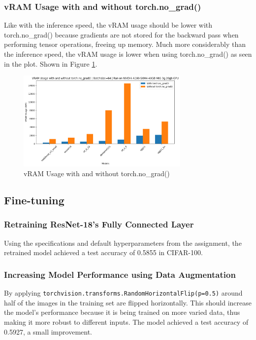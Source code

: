 \documentclass[a4paper]{article}
\begin{document}
\subsubsection{vRAM Usage with and without torch.no\_grad()}
Like with the inference speed, the vRAM usage should be lower with torch.no\_grad() because gradients are not
stored for the backward pass when performing tensor operations, freeing up memory. Much more considerably than the
inference speed, the vRAM usage is lower when using torch.no\_grad() as seen in the plot. Shown in Figure
\ref{fig:VRAM-vs-noGrad}.
\begin{figure}[h]
    \centering
    \includegraphics[width=0.75\textwidth]{"imgs/VRAM-vs-noGrad.png"}
    \caption{vRAM Usage with and without torch.no\_grad()}
    \label{fig:VRAM-vs-noGrad}
\end{figure}
\bigskip

\subsection{Fine-tuning}
\subsubsection{Retraining ResNet-18's Fully Connected Layer}
Using the specifications and default hyperparameters from the assignment, the retrained model achieved a test
accuracy of 0.5855 in CIFAR-100.

\subsubsection{Increasing Model Performance using Data Augmentation}
By applying \texttt{torchvision.transforms.RandomHorizontalFlip(p=0.5)} around half of the images in the training
set are flipped horizontally. This should increase the model's performance because it is being trained on more
varied data, thus making it more robust to different inputs. The model achieved a test accuracy of 0.5927, a small
improvement.
\end{document}
